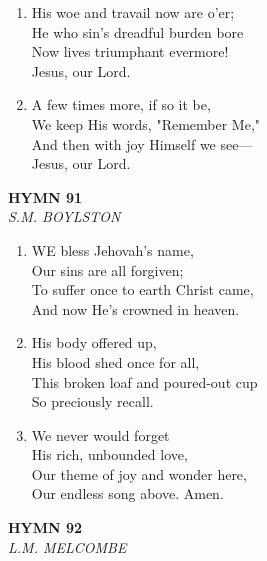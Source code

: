 \begin{enumerate}
    \item His woe and travail now are o'er; \\
        He who sin's dreadful burden bore \\
        Now lives triumphant evermore! \\
        Jesus, our Lord.

    \item A few times more, if so it be, \\
        We keep His words, "Remember Me," \\
        And then with joy Himself we see--- \\
        Jesus, our Lord.

\end{enumerate}

\newpage
\begin{center}
    {\Large \textbf{HYMN 91\textdagger{}}}
    \\
    \textit{S.M. BOYLSTON}
\end{center}
\vspace{1em}

\begin{enumerate}
    \item WE bless Jehovah's name, \\
        Our sins are all forgiven; \\
        To suffer once to earth Christ came, \\
        And now He's crowned in heaven.

    \item His body offered up, \\
        His blood shed once for all, \\
        This broken loaf and poured-out cup \\
        So preciously recall.

    \item We never would forget \\
        His rich, unbounded love, \\
        Our theme of joy and wonder here, \\
        Our endless song above. Amen.

\end{enumerate}

\newpage
\begin{center}
    {\Large \textbf{HYMN 92\textdagger{}}}
    \\
    \textit{L.M. MELCOMBE}
\end{center}
\vspace{1em}

